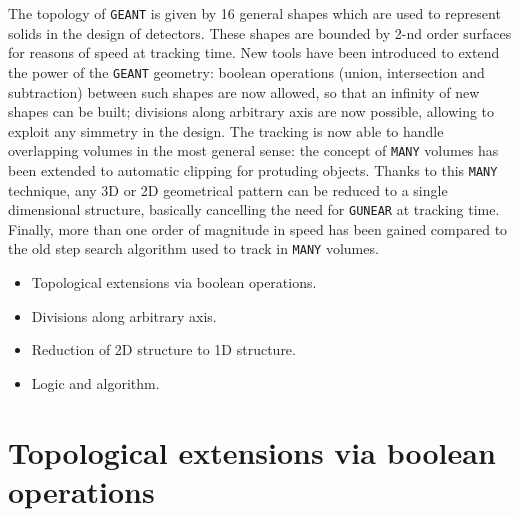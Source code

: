       

The topology of 
{\tt GEANT} is given by 16 general shapes which are used to represent
solids in the design of detectors. These shapes are bounded by 2-nd order
surfaces for reasons of speed at tracking time. New tools have been 
introduced to extend the power of the {\tt GEANT} geometry: boolean operations 
(union, intersection and subtraction) between such shapes are now allowed, so
that an infinity of new shapes can be built; divisions along arbitrary axis
are now possible, allowing to exploit any simmetry in the design.
The tracking is now able to handle overlapping volumes in the most general
sense: the concept of {\tt MANY} volumes has been extended to automatic 
clipping 
for protuding objects. Thanks to this {\tt MANY} technique, 
any 3D or 2D geometrical
pattern can be reduced to a single dimensional structure, basically cancelling
the need for {\tt GUNEAR} at tracking time. 
Finally, more than one order of magnitude in speed has been gained compared
to the old step search algorithm used to track in {\tt MANY} volumes. \\[.5cm]
\begin{itemize}
\item Topological extensions via boolean operations.
\item Divisions along arbitrary axis.
\item Reduction of 2D structure to 1D structure.
\item Logic and algorithm.
\end{itemize} 
 
\section{Topological extensions via boolean operations}

